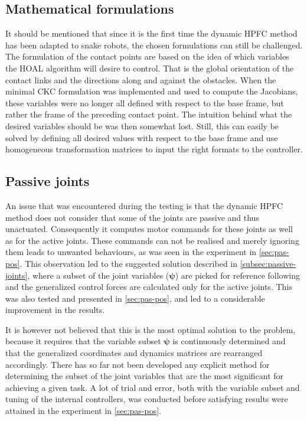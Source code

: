 \subsection{Mathematical formulations}

It should be mentioned that since it is the first time the dynamic HPFC method has been adapted to snake robots, the chosen formulations can still be challenged. The formulation of the contact points are based on the idea of which variables the HOAL algorithm will desire to control. That is the global orientation of the contact links and the directions along and against the obstacles. When the minimal CKC formulation was implemented and used to compute the Jacobians, these variables were no longer all defined with respect to the base frame, but rather the frame of the preceding contact point. The intuition behind what the desired variables should be was then somewhat lost. Still, this can easily be solved by defining all desired values with respect to the base frame and use homogeneous transformation matrices to input the right formats to the controller.

\subsection{Passive joints}\label{subsec:dis-passive-joints}

An issue that was encountered during the testing is that the dynamic HPFC method does not consider that some of the joints are passive and thus unactuated. Consequently it computes motor commands for these joints as well as for the active joints. These commands can not be realised and merely ignoring them leads to unwanted behaviours, as was seen in the experiment in \ref{sec:pas-pos}. This observation led to the suggested solution described in \ref{subsec:passive-joints}, where a subset of the joint variables ($\boldsymbol{\psi}$) are picked for reference following and the generalized control forces are calculated only for the active joints. This was also tested and presented in \ref{sec:pas-pos}, and led to a considerable improvement in the results.

It is however not believed that this is the most optimal solution to the problem, because it requires that the variable subset $\boldsymbol{\psi}$ is continuously determined and that the generalized coordinates and dynamics matrices are rearranged accordingly. There has so far not been developed any explicit method for determining the subset of the joint variables that are the most significant for achieving a given task. A lot of trial and error, both with the variable subset and tuning of the internal controllers, was conducted before satisfying results were attained in the experiment in \ref{sec:pas-pos}.

